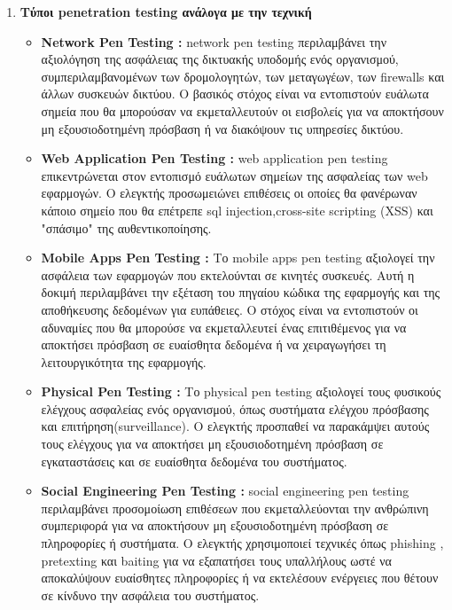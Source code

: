 {\begin{enumerate}
\begin{itemize}
    \end{itemize}
    \item{\textbf{ Τύποι \lt penetration testing \gt ανάλογα με την τεχνική}}
    \begin{itemize}
        \item \lt \textbf{Network Pen Testing :}  \lt network pen testing \gt περιλαμβάνει την αξιολόγηση της ασφάλειας της δικτυακής υποδομής ενός οργανισμού, συμπεριλαμβανομένων των δρομολογητών, των μεταγωγέων, των \lt firewalls \gt και άλλων συσκευών δικτύου. Ο βασικός στόχος είναι να εντοπιστούν ευάλωτα σημεία που θα μπορούσαν να εκμεταλλευτούν οι εισβολείς για να αποκτήσουν μη εξουσιοδοτημένη πρόσβαση ή να διακόψουν τις υπηρεσίες δικτύου.  

       
        \item \lt \textbf{Web Application Pen Testing :} \gt  \lt web application pen testing \gt επικεντρώνεται στον εντοπισμό ευάλωτων σημείων της ασφαλείας των \lt web \gt εφαρμογών. Ο ελεγκτής προσωμειώνει επιθέσεις οι οποίες θα φανέρωναν κάποιο σημείο που θα επέτρεπε \lt sql injection,cross-site scripting (XSS) και "σπάσιμο" της αυθεντικοποίησης.
        \item \lt \textbf{Mobile Apps Pen Testing :} \gt Το \lt mobile apps pen testing \gt αξιολογεί την ασφάλεια των εφαρμογών που εκτελούνται σε κινητές συσκευές. Αυτή η δοκιμή περιλαμβάνει την εξέταση του πηγαίου κώδικα της εφαρμογής και της αποθήκευσης δεδομένων για ευπάθειες. Ο στόχος είναι να εντοπιστούν οι αδυναμίες που θα μπορούσε να εκμεταλλευτεί ένας επιτιθέμενος για να αποκτήσει πρόσβαση σε ευαίσθητα δεδομένα ή να χειραγωγήσει τη λειτουργικότητα της εφαρμογής.
        \item \lt \textbf{Physical Pen Testing :} \gt Το \lt physical pen testing \gt αξιολογεί τους φυσικούς ελέγχους ασφαλείας ενός οργανισμού, όπως συστήματα ελέγχου πρόσβασης και επιτήρηση(\lt surveillance)\gt. Ο ελεγκτής προσπαθεί να παρακάμψει αυτούς τους ελέγχους για να αποκτήσει μη εξουσιοδοτημένη πρόσβαση σε εγκαταστάσεις και σε ευαίσθητα δεδομένα του συστήματος. 
        \item \lt \textbf{Social Engineering Pen Testing :}  \lt social engineering pen testing \gt περιλαμβάνει προσομοίωση επιθέσεων που εκμεταλλεύονται την ανθρώπινη συμπεριφορά για να αποκτήσουν μη εξουσιοδοτημένη πρόσβαση σε πληροφορίες ή συστήματα. Ο ελεγκτής χρησιμοποιεί τεχνικές όπως  \lt phishing ,   pretexting \gt και \lt baiting \gt για να εξαπατήσει τους υπαλλήλους ωστέ να αποκαλύψουν ευαίσθητες πληροφορίες ή να εκτελέσουν ενέργειες που θέτουν σε κίνδυνο την ασφάλεια του συστήματος. 
        

\end{itemize}
\end{enumerate}}
